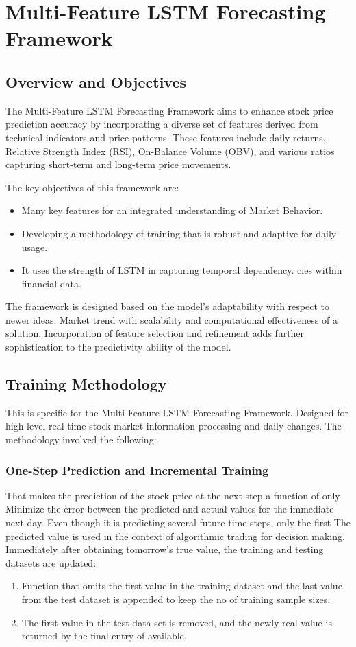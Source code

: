 \section{Multi-Feature LSTM Forecasting Framework}
\subsection{Overview and Objectives}
The Multi-Feature LSTM Forecasting Framework aims to enhance stock price prediction accuracy by incorporating a diverse set of features derived from technical indicators and price patterns. These features include daily returns, Relative Strength Index (RSI), On-Balance Volume (OBV), and various ratios capturing short-term and long-term price movements. 

The key objectives of this framework are:
\begin{itemize}
    \item Many key features for an integrated understanding of
Market Behavior.
    \item Developing a methodology of training that is robust and adaptive for daily usage.
    \item It uses the strength of LSTM in capturing temporal dependency.
cies within financial data.
\end{itemize}

The framework is designed based on the model's adaptability with respect to newer ideas. Market trend with scalability and computational effectiveness of a solution.
Incorporation of feature selection and refinement adds further sophistication to the predictivity ability of the model.

\subsection{Training Methodology}
This is specific for the Multi-Feature LSTM Forecasting Framework. Designed for high-level real-time stock market information processing and daily changes. The methodology involved the following:
\subsubsection{One-Step Prediction and Incremental Training}
That makes the prediction of the stock price at the next step a function of only
Minimize the error between the predicted and actual values for the immediate next day. Even though it is predicting several future time steps, only the first
The predicted value is used in the context of algorithmic trading for decision making.
Immediately after obtaining tomorrow's true value, the training and testing datasets
are updated:
\begin{enumerate}
    \item Function that omits the first value in the training dataset and the last value from the test dataset is appended to keep the no of training sample sizes.
    \item The first value in the test data set is removed, and the newly
real value is returned by the final entry of available.
\end{enumerate}

